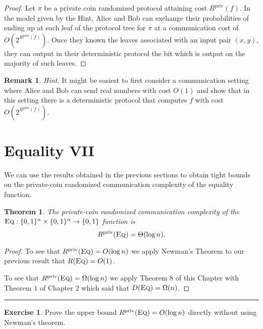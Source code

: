 \documentclass[11pt]{amsart}
\theoremstyle{plain}
\newtheorem{theorem}{Theorem}
\theoremstyle{definition}
\newtheorem{exercise}{Exercise}
\newtheorem{remark}{Remark}
\theoremstyle{plain}
\newcommand{\Eq}{\textsc{Eq}}
\newcommand{\Rpriv}{R^{\mathrm{priv}}}
\newcommand{\exercises}{\bigskip \noindent\rule{8cm}{0.4pt} \medskip}
\begin{document}
\begin{proof}
Let $\pi$ be a private coin randomized protocol attaining cost $\Rpriv(f)$. In the model given by the Hint, Alice and Bob can exchange their probabilities of ending up at each leaf of the protocol tree for $\pi$ at a communication cost of $O(2^{\Rpriv(f)})$. Once they known the leaves associated with an input pair $(x,y)$, they can output in their deterministic protocol the bit which is output on the majority of such leaves.
\end{proof}

\bigskip
\begin{remark}
\emph{Hint.} It might be easiest to first consider a communication setting where Alice and Bob can send real numbers with cost $O(1)$ and show that in this setting there is a deterministic protocol that computes $f$ with cost $O(2^{\Rpriv(f)})$.
\end{remark}

\newpage 
\section{Equality VII}

We can use the results obtained in the previous sections to obtain tight bounds on the private-coin randomized communication complexity of the equality function.

\begin{theorem}
The private-coin randomized communication complexity of the $\Eq : \{0,1\}^n \times \{0,1\}^n \to \{0,1\}$ function is
\[
\Rpriv(\Eq) = \Theta( \log n).
\]
\end{theorem}

\begin{proof}
To see that $\Rpriv(\Eq) = O(\log n)$ we apply Newman's Theorem to our previous result that $R(\Eq) = O(1)$.

To see that $\Rpriv(\Eq) = \Omega(\log n)$ we apply Theorem 8 of this Chapter with Theorem $1$ of Chapter $2$ which said that $D(\Eq) = \Omega(n)$.
\end{proof}

\exercises

\begin{exercise}
Prove the upper bound $\Rpriv(\Eq) = O( \log n)$ directly without using Newman's theorem.
\end{exercise}
\end{document}
